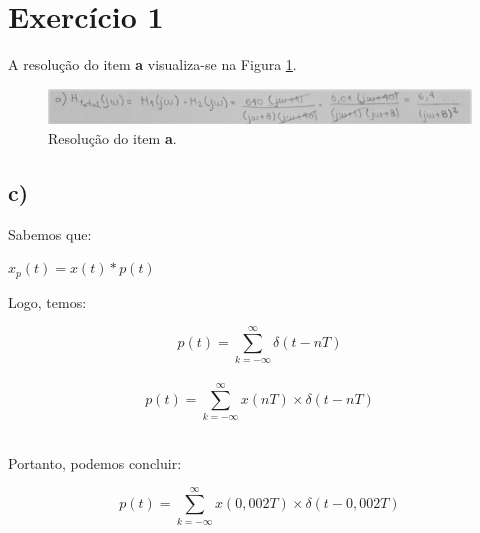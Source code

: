 \documentclass[a4paper,12pt,oneside,openany,table,xcdraw]{article}
\begin{document}
\newcommand{\thedepartment}{Faculdade de Engenharia Elétrica}
\newcommand{\thecourse}{FEELT}
\newcommand{\thetitle}{LISTA DE EXERCÍCIOS EXTRAS}
\newcommand{\thetype}{Relatório da Disciplina de Sinais e Sistemas 2}
\newcommand{\theproftitle}{Doutor em Engenharia Elétrica com ênfase em Telecomunicações}
\newcommand{\thestudent}{Lesly Viviane Montúfar Berrios\\
\centering11811ETE001}
\newcommand{\theadvisor}{Prof. Alan Petrônio Pinheiro}
\newcommand{\thecity}{Uberlândia}

\thispagestyle{empty}


\onehalfspacing
\tableofcontents %
\newpage

\section{Exercício 1}
A resolução do item \textbf{a} visualiza-se na Figura \ref{scan:1a}.

\begin{figure}[H]
\centering
\captionsetup{font=scriptsize}
\includegraphics[width=14.5cm]{1a}
\caption{Resolução do item \textbf{a}.}
\label{scan:1a}
\end{figure}



\subsection{c)}
Sabemos que:
\begin{center}
    $x_p(t) = x(t) * p(t)$\\
    \vspace{0.25cm}
\end{center}

Logo, temos:
\begin{center}
    $$p(t) = \sum_{k=- \infty}^{\infty} \delta(t - nT)$$\\
    \vspace{0.25cm}
    $$p(t) = \sum_{k=- \infty}^{\infty} x(nT) \times \delta(t - nT)$$\\
    \vspace{0.25cm}
\end{center}

Portanto, podemos concluir:
\begin{center}
    $$p(t) = \sum_{k=- \infty}^{\infty} x(0,002T) \times \delta(t - 0,002T)$$\\
\end{center}
\end{document}

